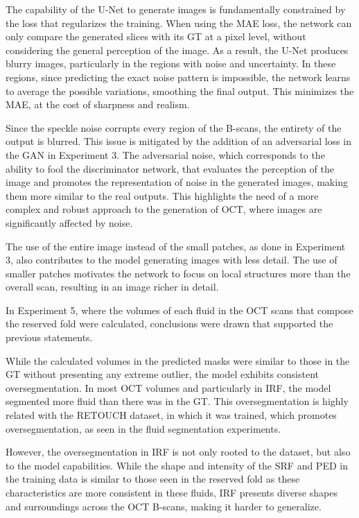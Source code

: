 \par
The capability of the U-Net to generate images is fundamentally constrained by the loss that regularizes the training. When using the MAE loss, the network can only compare the generated slices with its GT at a pixel level, without considering the general perception of the image. As a result, the U-Net produces blurry images, particularly in the regions with noise and uncertainty. In these regions, since predicting the exact noise pattern is impossible, the network learns to average the possible variations, smoothing the final output. This minimizes the MAE, at the cost of sharpness and realism.
\par
Since the speckle noise corrupts every region of the B-scans, the entirety of the output is blurred. This issue is mitigated by the addition of an adversarial loss in the GAN in Experiment 3. The adversarial noise, which corresponds to the ability to fool the discriminator network, that evaluates the perception of the image and promotes the representation of noise in the generated images, making them more similar to the real outputs. This highlights the need of a more complex and robust approach to the generation of OCT, where images are significantly affected by noise.
\par
The use of the entire image instead of the small patches, as done in Experiment 3, also contributes to the model generating images with less detail. The use of smaller patches motivates the network to focus on local structures more than the overall scan, resulting in an image richer in detail.
\par
In Experiment 5, where the volumes of each fluid in the OCT scans that compose the reserved fold were calculated, conclusions were drawn that supported the previous statements. 
\par
While the calculated volumes in the predicted masks were similar to those in the GT without presenting any extreme outlier, the model exhibits consistent oversegmentation. In most OCT volumes and particularly in IRF, the model segmented more fluid than there was in the GT. This oversegmentation is highly related with the RETOUCH dataset, in which it was trained, which promotes oversegmentation, as seen in the fluid segmentation experiments. 
\par
However, the oversegmentation in IRF is not only rooted to the dataset, but also to the model capabilities. While the shape and intensity of the SRF and PED in the training data is similar to those seen in the reserved fold as these characteristics are more consistent in these fluids, IRF presents diverse shapes and surroundings across the OCT B-scans, making it harder to generalize.
